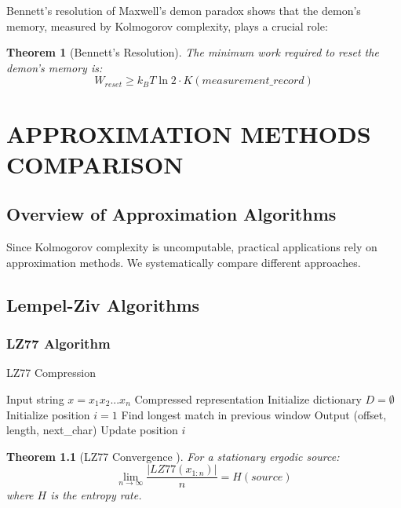\documentclass[12pt,a4paper]{report}
\newtheorem{theorem}{Theorem}[chapter]
\begin{document}
Bennett's resolution of Maxwell's demon paradox \cite{bennett1982thermodynamics} shows that the demon's memory, measured by Kolmogorov complexity, plays a crucial role:

\begin{theorem}[Bennett's Resolution]
The minimum work required to reset the demon's memory is:
\begin{equation}
W_{reset} \geq k_B T \ln 2 \cdot K(measurement\_record)
\end{equation}
\end{theorem}

\chapter{APPROXIMATION METHODS COMPARISON}

\section{Overview of Approximation Algorithms}

Since Kolmogorov complexity is uncomputable, practical applications rely on approximation methods. We systematically compare different approaches.

\section{Lempel-Ziv Algorithms}

\subsection{LZ77 Algorithm}

\begin{algorithm}
\caption{LZ77 Compression}
\begin{algorithmic}[1]
\REQUIRE Input string $x = x_1x_2...x_n$
\ENSURE Compressed representation
\STATE Initialize dictionary $D = \emptyset$
\STATE Initialize position $i = 1$
    \STATE Find longest match in previous window
    \STATE Output (offset, length, next\_char)
    \STATE Update position $i$
\ENDWHILE
\end{algorithmic}
\end{algorithm}

\begin{theorem}[LZ77 Convergence \cite{ziv1977universal}]
For a stationary ergodic source:
\begin{equation}
\lim_{n \to \infty} \frac{|LZ77(x_{1:n})|}{n} = H(source)
\end{equation}
where $H$ is the entropy rate.
\end{theorem}
\end{document}
